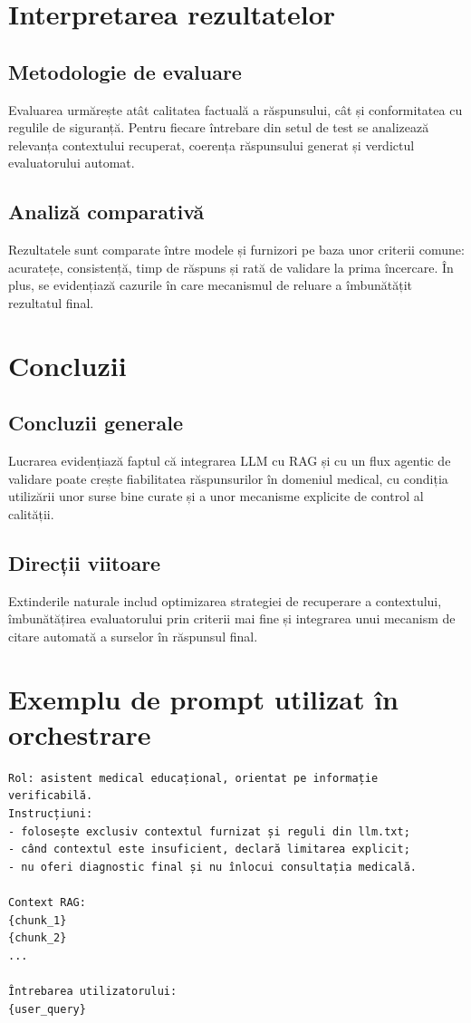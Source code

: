 \documentclass[12pt, a4paper, oneside, romanian]{teza-upb}
\begin{document}
\chapter{Interpretarea rezultatelor}
\section{Metodologie de evaluare}
Evaluarea urmărește atât calitatea factuală a răspunsului, cât și conformitatea cu regulile de siguranță. Pentru fiecare întrebare din setul de test se analizează relevanța contextului recuperat, coerența răspunsului generat și verdictul evaluatorului automat.

\section{Analiză comparativă}
Rezultatele sunt comparate între modele și furnizori pe baza unor criterii comune: acuratețe, consistență, timp de răspuns și rată de validare la prima încercare. În plus, se evidențiază cazurile în care mecanismul de reluare a îmbunătățit rezultatul final.

\chapter{Concluzii}
\section{Concluzii generale}
Lucrarea evidențiază faptul că integrarea LLM cu RAG și cu un flux agentic de validare poate crește fiabilitatea răspunsurilor în domeniul medical, cu condiția utilizării unor surse bine curate și a unor mecanisme explicite de control al calității.

\section{Direcții viitoare}
Extinderile naturale includ optimizarea strategiei de recuperare a contextului, îmbunătățirea evaluatorului prin criterii mai fine și integrarea unui mecanism de citare automată a surselor în răspunsul final.





\appendix
\chapter{Exemplu de prompt utilizat în orchestrare}
\begin{verbatim}
Rol: asistent medical educațional, orientat pe informație verificabilă.
Instrucțiuni:
- folosește exclusiv contextul furnizat și reguli din llm.txt;
- când contextul este insuficient, declară limitarea explicit;
- nu oferi diagnostic final și nu înlocui consultația medicală.

Context RAG:
{chunk_1}
{chunk_2}
...

Întrebarea utilizatorului:
{user_query}
\end{verbatim}
\end{document}
